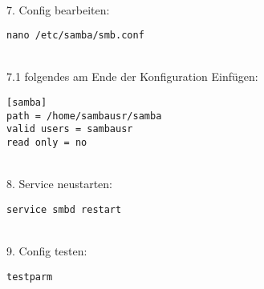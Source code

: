 ~\\
7. Config bearbeiten:
\begin{lstlisting}
nano /etc/samba/smb.conf
\end{lstlisting}
~\\
7.1 folgendes am Ende der Konfiguration Einfügen:
\begin{lstlisting}
[samba]
path = /home/sambausr/samba
valid users = sambausr
read only = no
\end{lstlisting}
~\\
8. Service neustarten:
\begin{lstlisting}
service smbd restart
\end{lstlisting}
~\\
9. Config testen:
\begin{lstlisting}
testparm
\end{lstlisting}
